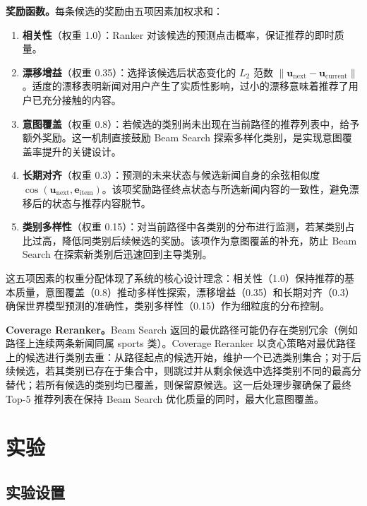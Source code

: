 \documentclass[twocolumn,10pt,a4paper]{ctexart}
\begin{document}
\textbf{奖励函数。}每条候选的奖励由五项因素加权求和：

\begin{enumerate}[nosep]
\item \textbf{相关性}（权重 1.0）：Ranker 对该候选的预测点击概率，保证推荐的即时质量。
\item \textbf{漂移增益}（权重 0.35）：选择该候选后状态变化的 $L_2$ 范数 $\|\mathbf{u}_{\text{next}} - \mathbf{u}_{\text{current}}\|$。适度的漂移表明新闻对用户产生了实质性影响，过小的漂移意味着推荐了用户已充分接触的内容。
\item \textbf{意图覆盖}（权重 0.8）：若候选的类别尚未出现在当前路径的推荐列表中，给予额外奖励。这一机制直接鼓励 Beam Search 探索多样化类别，是实现意图覆盖率提升的关键设计。
\item \textbf{长期对齐}（权重 0.3）：预测的未来状态与候选新闻自身的余弦相似度 $\cos(\mathbf{u}_{\text{next}}, \mathbf{e}_{\text{item}})$。该项奖励路径终点状态与所选新闻内容的一致性，避免漂移后的状态与推荐内容脱节。
\item \textbf{类别多样性}（权重 0.15）：对当前路径中各类别的分布进行监测，若某类别占比过高，降低同类别后续候选的奖励。该项作为意图覆盖的补充，防止 Beam Search 在探索新类别后迅速回到主导类别。
\end{enumerate}

这五项因素的权重分配体现了系统的核心设计理念：相关性（1.0）保持推荐的基本质量，意图覆盖（0.8）推动多样性探索，漂移增益（0.35）和长期对齐（0.3）确保世界模型预测的准确性，类别多样性（0.15）作为细粒度的分布控制。

\textbf{Coverage Reranker。}Beam Search 返回的最优路径可能仍存在类别冗余（例如路径上连续两条新闻同属 sports 类）。Coverage Reranker 以贪心策略对最优路径上的候选进行类别去重：从路径起点的候选开始，维护一个已选类别集合；对于后续候选，若其类别已存在于集合中，则跳过并从剩余候选中选择类别不同的最高分替代；若所有候选的类别均已覆盖，则保留原候选。这一后处理步骤确保了最终 Top-5 推荐列表在保持 Beam Search 优化质量的同时，最大化意图覆盖。

\section{实验}

\subsection{实验设置}
\end{document}
